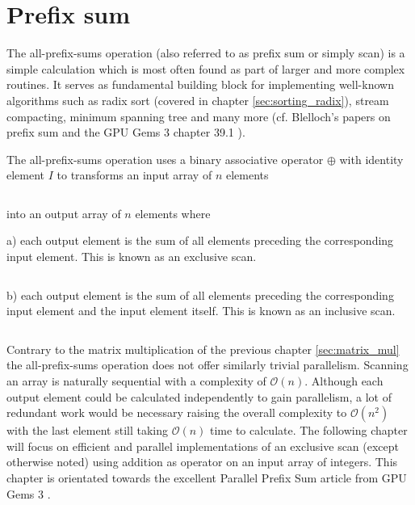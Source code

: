 \section{Prefix sum}
\label{sec:prefix_sum}


The all-prefix-sums operation (also referred to as prefix sum or simply scan) is a simple calculation which is most often found as part of larger and more complex routines. It serves as fundamental building block for implementing well-known algorithms such as radix sort (covered in chapter \ref{sec:sorting_radix}), stream compacting, minimum spanning tree and many more (cf. Blelloch's papers on prefix sum \cite{scan_blelloch_examples} \cite{scan_blelloch} and the GPU Gems 3 chapter 39.1 \cite{gpu_gems_3_chapter_39}).

The all-prefix-sums operation uses a binary associative operator $\oplus$ with identity element $I$ to transforms an input array of $n$ elements

\begin{equation*}
[a_0, a_1, \dots, a_{n-1}]
\end{equation*}

into an output array of $n$ elements where

a) each output element is the sum of all elements preceding the corresponding input element. This is known as an exclusive scan. \cite{gpu_gems_3_chapter_39}

\begin{equation*}
[I, a_0, (a_0 \oplus a_1), \dots, (a_0 \oplus a_1 \oplus \dots \oplus a_{n-2})]
\end{equation*}

b) each  output element is the sum of all elements preceding the corresponding input element and the input element itself. This is known as an inclusive scan. \cite{gpu_gems_3_chapter_39}

\begin{equation*}
[a_0, (a_0 \oplus a_1), \dots, (a_0 \oplus a_1 \oplus \dots \oplus a_{n-1})]
\end{equation*}

Contrary to the matrix multiplication of the previous chapter \ref{sec:matrix_mul} the all-prefix-sums operation does not offer similarly trivial parallelism. Scanning an array is naturally sequential with a complexity of $\mathcal{O}(n)$. Although each output element could be calculated independently to gain parallelism, a lot of redundant work would be necessary raising the overall complexity to $\mathcal{O}(n^2)$ with the last element still taking $\mathcal{O}(n)$ time to calculate.
The following chapter will focus on efficient and parallel implementations of an exclusive scan (except otherwise noted) using addition as operator on an input array of integers. This chapter is orientated towards the excellent Parallel Prefix Sum article from GPU Gems 3 \cite{gpu_gems_3_chapter_39}.



